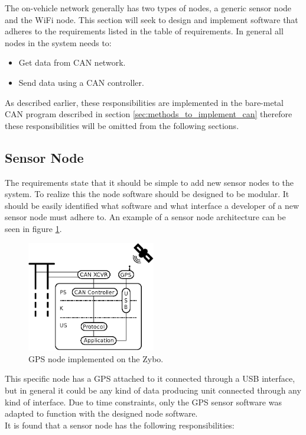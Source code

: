 The on-vehicle network generally has two types of nodes, a generic sensor node and the WiFi node.
This section will seek to design and implement software that adheres to the requirements listed in the table of requirements.
In general all nodes in the system needs to:
\begin{itemize}
\item Get data from CAN network.
\item Send data using a CAN controller.
\end{itemize}
As described earlier, these responsibilities are implemented in the bare-metal CAN program described in section \ref{sec:methods_to_implement_can} therefore these responsibilities will be omitted from the following sections.

\subsection{Sensor Node}
\label{sec:sensor_node}
The requirements state that it should be simple to add new sensor nodes to the system. 
To realize this the node software should be designed to be modular.
It should be easily identified what software and what interface a developer of a new sensor node must adhere to.
An example of a sensor node architecture can be seen in figure \ref{fig:gps_node}.


\begin{figure}[!h]
\centering
\includegraphics[width=0.5\textwidth]{graphics/analysis_gps.eps}
\caption{GPS node implemented on the Zybo.}
\label{fig:gps_node}
\end{figure}

This specific node has a GPS attached to it connected through a USB interface, but in general it could be any kind of data producing unit connected through any kind of interface.
Due to time constraints, only the GPS sensor software was adapted to function with the designed node software.\\
It is found that a sensor node has the following responsibilities:

